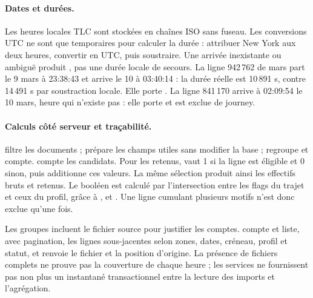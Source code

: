 \paragraph{Dates et durées.}
Les heures locales TLC sont stockées en chaînes ISO sans fuseau. Les conversions
UTC ne sont que temporaires pour calculer la durée : attribuer New York aux
deux heures, convertir en UTC, puis soustraire. Une arrivée inexistante ou ambiguë
produit , pas une durée locale de secours. La ligne 942\,762 de mars
part le 9 mars à 23:38:43 et arrive le 10 à 03:40:14 : la durée réelle est
10\,891 s, contre 14\,491 s par soustraction locale. Elle porte
. La ligne 841\,170 arrive à 02:09:54 le 10 mars, heure qui
n'existe pas : elle porte  et est exclue de journey.

\paragraph{Calculs côté serveur et traçabilité.}
 filtre les documents ;  prépare les champs utiles
sans modifier la base ;  regroupe et compte.  compte
les candidats. Pour les retenus,  vaut 1 si la ligne est éligible et
0 sinon, puis  additionne ces valeurs. La même sélection produit
ainsi les effectifs bruts et retenus. Le booléen est calculé par
l'intersection entre les flags du trajet et ceux du profil, grâce à
,  et . Une ligne cumulant plusieurs
motifs n'est donc exclue qu'une fois.

Les groupes incluent le fichier source pour justifier les comptes.  compte et liste, avec pagination,
les lignes sous-jacentes selon zones, dates, créneau, profil et statut, et renvoie
le fichier et la position d'origine.  La présence de fichiers complets ne prouve pas la
couverture de chaque heure ; les services ne fournissent pas non plus un
instantané transactionnel entre la lecture des imports et l'agrégation.
